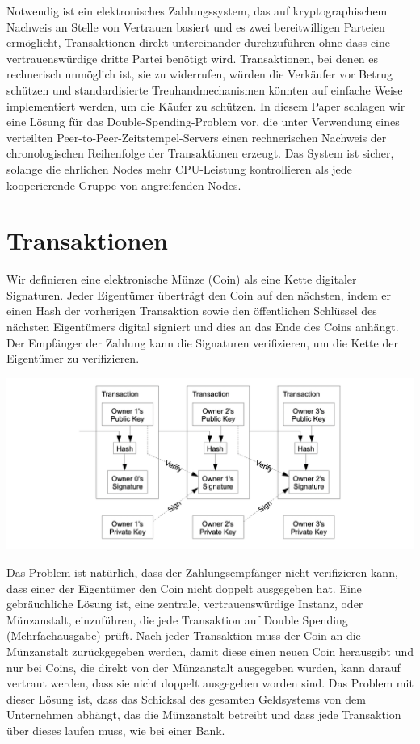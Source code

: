 \documentclass[10pt]{article}
\begin{document}
	Notwendig ist ein elektronisches Zahlungssystem, das auf kryptographischem Nachweis an Stelle von Vertrauen basiert und es zwei bereitwilligen Parteien ermöglicht, Transaktionen direkt untereinander durchzuführen ohne dass eine vertrauenswürdige dritte Partei benötigt wird. Transaktionen, bei denen es rechnerisch unmöglich ist, sie zu widerrufen, würden die Verkäufer vor Betrug schützen und standardisierte Treuhandmechanismen könnten auf einfache Weise implementiert werden, um die Käufer zu schützen. In diesem Paper schlagen wir eine Lösung für das Double-Spending-Problem vor, die unter Verwendung eines verteilten Peer-to-Peer-Zeitstempel-Servers einen rechnerischen Nachweis der chronologischen Reihenfolge der Transaktionen erzeugt. Das System ist sicher, solange die ehrlichen Nodes mehr CPU-Leistung kontrollieren als jede kooperierende Gruppe von angreifenden Nodes.
	
	\section{Transaktionen}
	Wir definieren eine elektronische Münze (Coin) als eine Kette digitaler Signaturen. Jeder Eigentümer überträgt den Coin auf den nächsten, indem er einen Hash der vorherigen Transaktion sowie den öffentlichen Schlüssel des nächsten Eigentümers digital signiert und dies an das Ende des Coins anhängt. Der Empfänger der Zahlung kann die Signaturen verifizieren, um die Kette der Eigentümer zu verifizieren.
	
	\begin{center}
		\includegraphics[scale=0.30]{pics/transactions.png}		
	\end{center}

	Das Problem ist natürlich, dass der Zahlungsempfänger nicht verifizieren kann, dass einer der Eigentümer den Coin nicht doppelt ausgegeben hat. Eine gebräuchliche Lösung ist, eine zentrale, vertrauenswürdige Instanz, oder Münzanstalt, einzuführen, die jede Transaktion auf Double Spending (Mehrfachausgabe) prüft. Nach jeder Transaktion muss der Coin an die Münzanstalt zurückgegeben werden, damit diese einen neuen Coin herausgibt und nur bei Coins, die direkt von der Münzanstalt ausgegeben wurden, kann darauf vertraut werden, dass sie nicht doppelt ausgegeben worden sind. Das Problem mit dieser Lösung ist, dass das Schicksal des gesamten Geldsystems von dem Unternehmen abhängt, das die Münzanstalt betreibt und dass jede Transaktion über dieses laufen muss, wie bei einer Bank.
	
\end{document}
